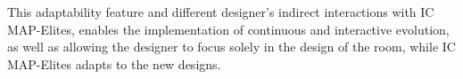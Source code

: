 This adaptability feature and different designer's indirect interactions with IC MAP-Elites, enables the implementation of continuous and interactive evolution, as well as allowing the designer to focus solely in the design of the room, while IC MAP-Elites adapts to the new designs.






